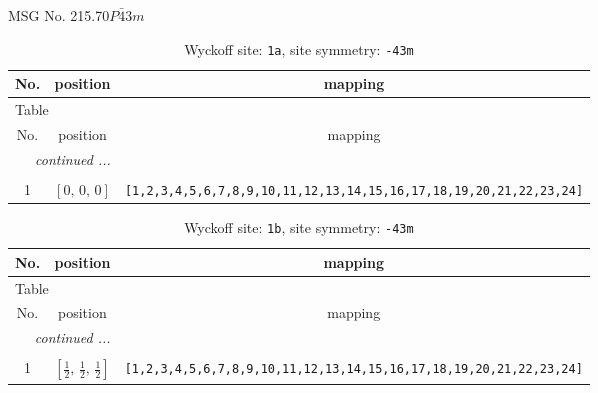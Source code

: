 \documentclass[fleqn,8pt]{jsarticle}
\begin{document}
\setcounter{MaxMatrixCols}{32}

\renewcommand{\tablename}{Table~}
\renewcommand{\figurename}{Figure~}
\begin{center}
\LARGE
MSG No. 215.70\quad$P\bar{4}3m$
\end{center}
\renewcommand{\arraystretch}{1.2}
\begin{longtable}{ccc}
\caption{Wyckoff site: {\tt 1a}, site symmetry: {\tt -43m}}
 \\
 \hline \hline
No. & position & mapping \\ \hline \endfirsthead

\multicolumn{2}{l}{\tablename\ \thetable{}} \\
 \hline \hline
No. & position & mapping \\ \hline \endhead

 \hline \hline
\multicolumn{2}{r}{\footnotesize\it continued ...} \\ \endfoot

 \hline \hline
\multicolumn{2}{r}{} \\ \endlastfoot

1 & $\left[ 0,\, 0,\, 0 \right]$ & {\tt [1,2,3,4,5,6,7,8,9,10,11,12,13,14,15,16,17,18,19,20,21,22,23,24]} \\
\end{longtable}
\renewcommand{\arraystretch}{1.2}
\begin{longtable}{ccc}
\caption{Wyckoff site: {\tt 1b}, site symmetry: {\tt -43m}}
 \\
 \hline \hline
No. & position & mapping \\ \hline \endfirsthead

\multicolumn{2}{l}{\tablename\ \thetable{}} \\
 \hline \hline
No. & position & mapping \\ \hline \endhead

 \hline \hline
\multicolumn{2}{r}{\footnotesize\it continued ...} \\ \endfoot

 \hline \hline
\multicolumn{2}{r}{} \\ \endlastfoot

1 & $\left[ \frac{1}{2},\, \frac{1}{2},\, \frac{1}{2} \right]$ & {\tt [1,2,3,4,5,6,7,8,9,10,11,12,13,14,15,16,17,18,19,20,21,22,23,24]} \\
\end{longtable}
\renewcommand{\arraystretch}{1.2}
\end{document}
